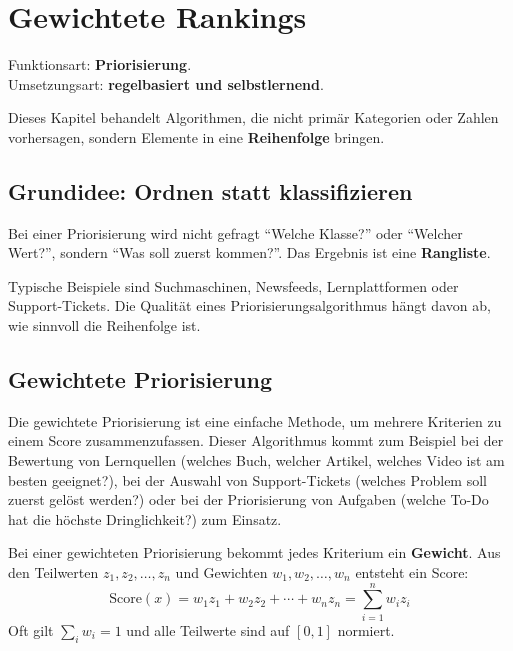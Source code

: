 \chapter{Gewichtete Rankings}
\label{chap:weighted-rankings}

\begin{myremark}
    Funktionsart: \textbf{Priorisierung}. \\
    Umsetzungsart: \textbf{regelbasiert und selbstlernend}.
\end{myremark}

\begin{myremark}
    Dieses Kapitel behandelt Algorithmen, die nicht primär Kategorien
    oder Zahlen vorhersagen, sondern Elemente in eine \textbf{Reihenfolge} bringen.
\end{myremark}

\section{Grundidee: Ordnen statt klassifizieren}

Bei einer Priorisierung wird nicht gefragt \enquote{Welche Klasse?} oder \enquote{Welcher Wert?},
sondern \enquote{Was soll zuerst kommen?}. Das Ergebnis ist eine \textbf{Rangliste}.

Typische Beispiele sind Suchmaschinen, Newsfeeds, Lernplattformen oder Support-Tickets.
Die Qualität eines Priorisierungsalgorithmus hängt davon ab, wie sinnvoll die Reihenfolge ist.

\section{Gewichtete Priorisierung}
Die gewichtete Priorisierung ist eine einfache Methode, um mehrere Kriterien zu einem Score zusammenzufassen. Dieser Algorithmus kommt zum Beispiel bei der Bewertung von Lernquellen (welches Buch, welcher Artikel, welches Video ist am besten geeignet?), bei der Auswahl von Support-Tickets (welches Problem soll zuerst gelöst werden?) oder bei der Priorisierung von Aufgaben (welche To-Do hat die höchste Dringlichkeit?) zum Einsatz.

\begin{mydefinition}
    Bei einer gewichteten Priorisierung bekommt jedes Kriterium ein \textbf{Gewicht}.
    Aus den Teilwerten $z_1, z_2, \ldots, z_n$ und Gewichten $w_1, w_2, \ldots, w_n$ entsteht ein Score:
    \[
        \text{Score}(x) = w_1 z_1 + w_2 z_2 + \cdots + w_n z_n = \sum_{i=1}^n w_i z_i
    \]
    Oft gilt $\sum_i w_i = 1$ und alle Teilwerte sind auf $[0,1]$ normiert.
\end{mydefinition}

